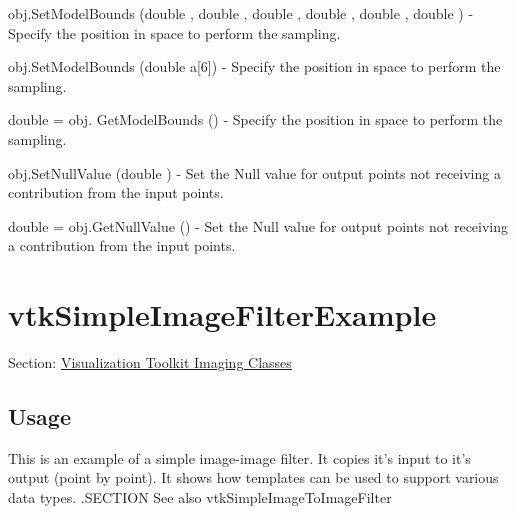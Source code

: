 \begin{DoxyItemize}
\item {\ttfamily obj.\-Set\-Model\-Bounds (double , double , double , double , double , double )} -\/ Specify the position in space to perform the sampling.  
\item {\ttfamily obj.\-Set\-Model\-Bounds (double a\mbox{[}6\mbox{]})} -\/ Specify the position in space to perform the sampling.  
\item {\ttfamily double = obj. Get\-Model\-Bounds ()} -\/ Specify the position in space to perform the sampling.  
\item {\ttfamily obj.\-Set\-Null\-Value (double )} -\/ Set the Null value for output points not receiving a contribution from the input points.  
\item {\ttfamily double = obj.\-Get\-Null\-Value ()} -\/ Set the Null value for output points not receiving a contribution from the input points.  
\end{DoxyItemize}\hypertarget{vtkimaging_vtksimpleimagefilterexample}{}\section{vtk\-Simple\-Image\-Filter\-Example}\label{vtkimaging_vtksimpleimagefilterexample}
Section\-: \hyperlink{sec_vtkimaging}{Visualization Toolkit Imaging Classes} \hypertarget{vtkwidgets_vtkxyplotwidget_Usage}{}\subsection{Usage}\label{vtkwidgets_vtkxyplotwidget_Usage}
This is an example of a simple image-\/image filter. It copies it's input to it's output (point by point). It shows how templates can be used to support various data types. .S\-E\-C\-T\-I\-O\-N See also vtk\-Simple\-Image\-To\-Image\-Filter

